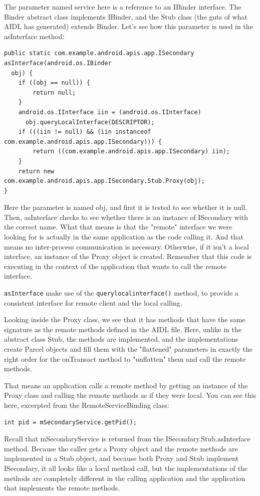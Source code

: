 \documentclass[11pt, a4paper]{book}
\begin{document}
The parameter named service here is a reference to an IBinder interface. The Binder abstract class implements IBinder, and the Stub class (the guts of what AIDL has generated) extends Binder. Let's see how this parameter is used in the asInterface method:
\begin{verbatim}
public static com.example.android.apis.app.ISecondary asInterface(android.os.IBinder 
  obj) {
    if ((obj == null)) {
        return null;
    }
    android.os.IInterface iin = (android.os.IInterface) 
      obj.queryLocalInterface(DESCRIPTOR);
    if (((iin != null) && (iin instanceof com.example.android.apis.app.ISecondary))) {
        return ((com.example.android.apis.app.ISecondary) iin);
    }
    return new com.example.android.apis.app.ISecondary.Stub.Proxy(obj);
}
\end{verbatim}

Here the parameter is named obj, and first it is tested to see whether it is null. Then, asInterface checks to see whether there is an instance of ISecondary with the correct name. What that means is that the "remote" interface we were looking for is actually in the same application as the code calling it. And that means no inter-process communication is necessary. Otherwise, if it isn't a local interface, an instance of the Proxy object is created. Remember that this code is executing in the context of the application that wants to call the remote interface.

\verb|asInterface| make use of the \verb|querylocalinterface()| method, to
provide a consistent interface for remote client and the local calling.

Looking inside the Proxy class, we see that it has methods that have the same signature as the remote methods defined in the AIDL file. Here, unlike in the abstract class Stub, the methods are implemented, and the implementations create Parcel objects and fill them with the "flattened" parameters in exactly the right order for the onTransact method to "unflatten" them and call the remote methods.

That means an application calls a remote method by getting an instance of the Proxy class and calling the remote methods as if they were local. You can see this here, excerpted from the RemoteServiceBinding class:
\begin{verbatim}
int pid = mSecondaryService.getPid();
\end{verbatim}

Recall that mSecondaryService is returned from the ISecondary.Stub.asInterface method. Because the caller gets a Proxy object and the remote methods are implemented in a Stub object, and because both Proxy and Stub implement ISecondary, it all looks like a local method call, but the implementations of the methods are completely different in the calling application and the application that implements the remote methods.
\end{document}
